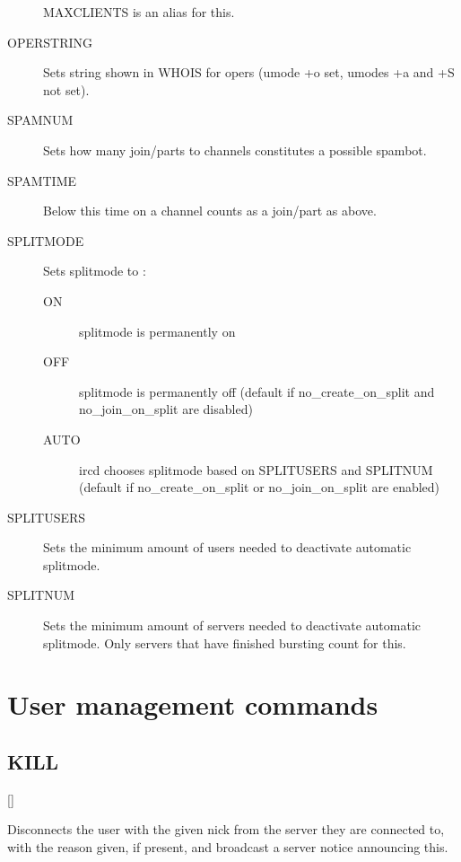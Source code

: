 \begin{description}
	MAXCLIENTS is an alias for this.

\item[{OPERSTRING}]
	Sets string shown in WHOIS for opers (umode +o set, umodes +a and +S
	not set).

\item[{SPAMNUM}]
	Sets how many join/parts to channels constitutes a possible spambot.

\item[{SPAMTIME}]
	Below this time on a channel
	counts as a join/part as above.

\item[{SPLITMODE}]
	Sets splitmode to :
\noindent
\begin{description}
\item[{ON}]
	splitmode is permanently on

\item[{OFF}]
	splitmode is permanently off (default if no\_create\_on\_split and
	no\_join\_on\_split are disabled)

\item[{AUTO}]
	ircd chooses splitmode based on SPLITUSERS and SPLITNUM (default if
	no\_create\_on\_split or no\_join\_on\_split are enabled)
\end{description}

\item[{SPLITUSERS}]
	Sets the minimum amount of users needed to deactivate automatic
	splitmode.

\item[{SPLITNUM}]
	Sets the minimum amount of servers needed to deactivate automatic
	splitmode. Only servers that have finished bursting count for this.
\end{description}

\section{User management commands}
\label{usercommands}

\subsection{KILL}

     []

	Disconnects the user with the given nick from the server they are
	connected to, with the reason given, if present, and broadcast a server
	notice announcing this.

